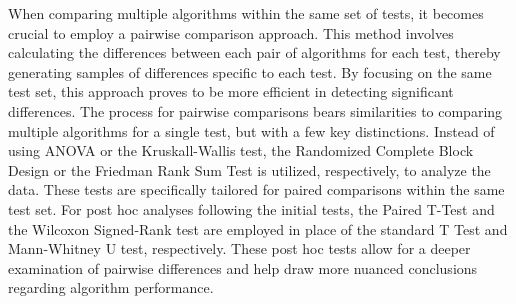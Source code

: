 			
			When comparing multiple algorithms within the same set of tests, it becomes crucial to employ a pairwise comparison approach. This method involves calculating the differences between each pair of algorithms for each test, thereby generating samples of differences specific to each test. By focusing on the same test set, this approach proves to be more efficient in detecting significant differences. The process for pairwise comparisons bears similarities to comparing multiple algorithms for a single test, but with a few key distinctions. Instead of using ANOVA or the Kruskall-Wallis test, the Randomized Complete Block Design or the Friedman Rank Sum Test is utilized, respectively, to analyze the data. These tests are specifically tailored for paired comparisons within the same test set. For post hoc analyses following the initial tests, the Paired T-Test and the Wilcoxon Signed-Rank test are employed in place of the standard T Test and Mann-Whitney U test, respectively. These post hoc tests allow for a deeper examination of pairwise differences and help draw more nuanced conclusions regarding algorithm performance.
		
